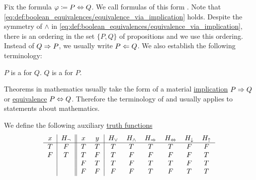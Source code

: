 \begin{definition}\label{def:equivalence}
  Fix the formula \( \varphi \coloneqq P \Leftrightarrow Q \). We call formulas of this form . Note that \eqref{eq:def:boolean_equivalences/equivalence_via_implication} holds. Despite the symmetry of \( \wedge \) in \eqref{eq:def:boolean_equivalences/equivalence_via_implication}, there is an ordering in the set \( \{ P, Q \} \) of propositions and we use this ordering. Instead of \( Q \Rightarrow P \), we usually write \( P \Leftarrow Q \). We also establish the following terminology:
  \begin{DefEnum}
     \( P \) is a  for \( Q \).
     \( Q \) is a  for \( P \).
  \end{DefEnum}
\end{definition}

\begin{remark}\label{remark:statements_as_implications}
  Theorems in mathematics usually take the form of a material \hyperref[def:material_implication]{implication} \( P \Rightarrow Q \) or \hyperref[def:equivalence]{equivalence} \( P \Leftrightarrow Q \). Therefore the terminology of  and  usually applies to statements about mathematics.
\end{remark}

\begin{definition}\label{def:propositional_truth_functions}
  We define the following auxiliary \hyperref[def:boolean_function]{truth functions}
  \begin{equation*}
    \begin{tabular}{c | c || c c | c c c c c c}
      \( x \) & \( H_\neg \) & \( x \) & \( y \) & \( H_\vee \) & \( H_\wedge \) & \( H_\Implies \) & \( H_{\Iff} \) & \( H_\downarrow \) & \( H_\uparrow \) \\
      \hline
      \( T \) & \( F \)      & \( T \) & \( T \) & \( T \)      & \( T \)        & \( T \)             & \( T \)        & \( F \)            & \( F \)          \\
      \( F \) & \( T \)      & \( T \) & \( F \) & \( T \)      & \( F \)        & \( F \)             & \( F \)        & \( F \)            & \( T \)          \\
              &              & \( F \) & \( T \) & \( T \)      & \( F \)        & \( T \)             & \( T \)        & \( F \)            & \( T \)          \\
              &              & \( F \) & \( F \) & \( F \)      & \( F \)        & \( T \)             & \( F \)        & \( T \)            & \( T \)
    \end{tabular}
  \end{equation*}
\end{definition}

